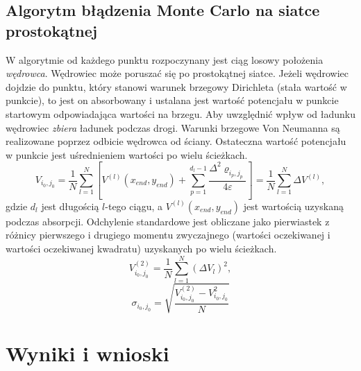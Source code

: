 \documentclass[a4paper, 12pt]{article}
\begin{document}
	\subsection*{Algorytm błądzenia Monte Carlo na siatce prostokątnej}
	
	W algorytmie od każdego punktu rozpoczynany jest ciąg losowy położenia \textit{wędrowca}. 
	Wędrowiec może poruszać się po prostokątnej siatce.
	Jeżeli wędrowiec dojdzie do punktu, który stanowi warunek brzegowy Dirichleta (stała wartość w punkcie), to jest on absorbowany i ustalana jest wartość potencjału w punkcie startowym odpowiadająca wartości na brzegu.
	Aby uwzględnić wpływ od ładunku wędrowiec \textit{zbiera} ładunek podczas drogi. 
	Warunki brzegowe Von Neumanna są realizowane poprzez odbicie wędrowca od ściany.
	Ostateczna wartość potencjału w punkcie jest uśrednieniem wartości po wielu ścieżkach. 
	\begin{equation}
		V_{i_0,j_0} = \frac{1}{N} \sum_{l=1}^{N} \left[V^{(l)}(x_{end},y_{end}) + \sum_{p=1}^{d_l-1}  \frac{\Delta^2 \varrho_{i_p,j_p}}{4\varepsilon} \right] = \frac{1}{N} \sum_{l = 1}^{N} \Delta V^{(l)},
	\end{equation}
	gdzie $d_l$ jest długością $l$-tego ciągu, a $V^{(l)}(x_{end},y_{end})$ jest wartością uzyskaną podczas absorpcji.
	Odchylenie standardowe jest obliczane jako pierwiastek z różnicy pierwszego i drugiego momentu zwyczajnego (wartości oczekiwanej i wartości oczekiwanej kwadratu) uzyskanych po wielu ścieżkach.
	\begin{equation}
		V_{i_0,j_0}^{(2)} = \frac{1}{N} \sum_{l=1}^N (\Delta V_l)^2,
	\end{equation}
	\begin{equation}
		\sigma_{i_0,j_0} = \sqrt{\frac{V_{i_0,j_0}^{(2)} - V_{i_0,j_0}^2}{N}}
	\end{equation}
	
	\newpage
	
	\section*{Wyniki i wnioski}
\end{document}
